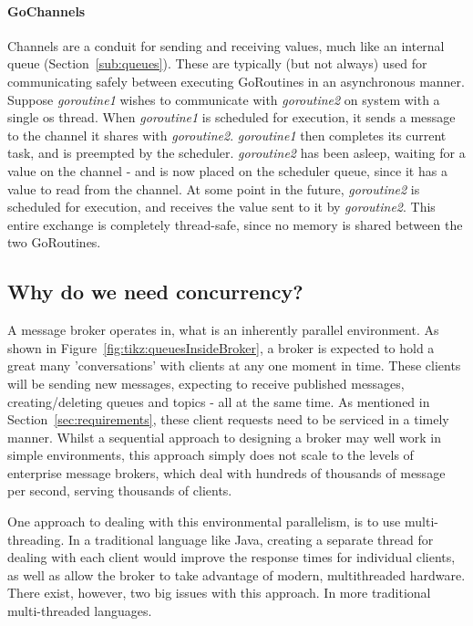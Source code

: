 \paragraph{GoChannels}

Channels are a conduit for sending and receiving values, much like an internal
queue (Section~\ref{sub:queues}). These are typically (but not always) used for
communicating safely between executing GoRoutines in an asynchronous manner.
Suppose \textit{goroutine1} wishes to communicate with \textit{goroutine2} on
system with a single \gls{os} thread. When \textit{goroutine1} is scheduled for
execution, it sends a message to the channel it shares with \textit{goroutine2}.
\textit{goroutine1} then completes its current task, and is \gls{preempted} by
the scheduler. \textit{goroutine2} has been asleep, waiting for a value on the
channel - and is now placed on the scheduler queue, since it has a value to read
from the channel. At some point in the future, \textit{goroutine2} is scheduled
for execution, and receives the value sent to it by \textit{goroutine2}. This
entire exchange is completely thread-safe, since no memory is shared between the
two GoRoutines.

\subsection{Why do we need concurrency?}
\label{sub:whyConcurrency}

A message broker operates in, what is an inherently parallel environment. As
shown in Figure~\ref{fig:tikz:queuesInsideBroker}, a broker is expected to hold
a great many 'conversations' with clients at any one moment in time. These
clients will be sending new messages, expecting to receive published messages,
creating/deleting queues and topics - all at the same time. As mentioned in
Section~\ref{sec:requirements}, these client requests need to be serviced in a
timely manner. Whilst a sequential approach to designing a broker may well work
in simple environments, this approach simply does not scale to the levels of
enterprise message brokers, which deal with hundreds of thousands of message per
second, serving thousands of clients.

One approach to dealing with this environmental parallelism, is to use
multi-threading. In a traditional language like Java, creating a separate thread
for dealing with each client would improve the response times for individual
clients, as well as allow the broker to take advantage of modern, multithreaded
hardware. There exist, however, two big issues with this approach. In more
traditional multi-threaded languages.

